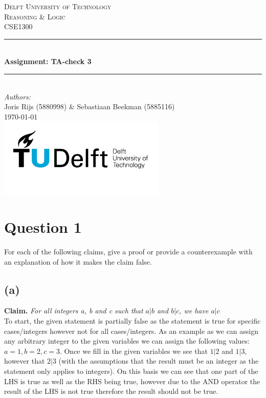 \documentclass[a4paper]{article}
\begin{document}
\begin{titlepage}
    \newcommand{\HRule}{\rule{\linewidth}{0.5mm}}
    \center

    \textsc{\LARGE Delft University of Technology}\\[1cm]

    \textsc{\Large Reasoning \& Logic}\\[0.2cm]
    \textsc{\large CSE1300}\\[1cm]
    \HRule \\[0.8cm]
    { \huge \bfseries Assignment: TA-check 3}\\[0.7cm]
    \HRule \\[2cm]
    \large
    \emph{Authors:}\\
    Joris Rijs (5880998) \& Sebastiaan Beekman (5885116)\\[1.5cm]
    {\large \today}\\[5cm]
    \includegraphics[width=0.6\textwidth]{images/TU_delft_logo.jpg}\\[1cm]
    \vfill
\end{titlepage}

\newpage
\tableofcontents

\newpage
\section{Question 1}
For each of the following claims, give a proof or provide a counterexample with an explanation of how it makes the claim false. \\
\subsection{(a)}
\textbf{Claim.} \textit{For all integers a, b and c such that $a | b$ and $b | c$, we have $a | c$} \\
To start, the given statement is partially false as the statement is true for specific cases/integers however not for all cases/integers.
As an example as we can assign any arbitrary integer to the given variables we can assign the following values: $a = 1, b = 2, c = 3$.
Once we fill in the given variables we see that $1 | 2 $ and $ 1 | 3$, however that $2 | 3$ (with the assumptions that the result must be an integer as the statement only applies to integers).
On this basis we can see that one part of the LHS is true as well as the RHS being true, however due to the AND operator the result of the LHS is not true therefore the result should not be true.
\end{document}
